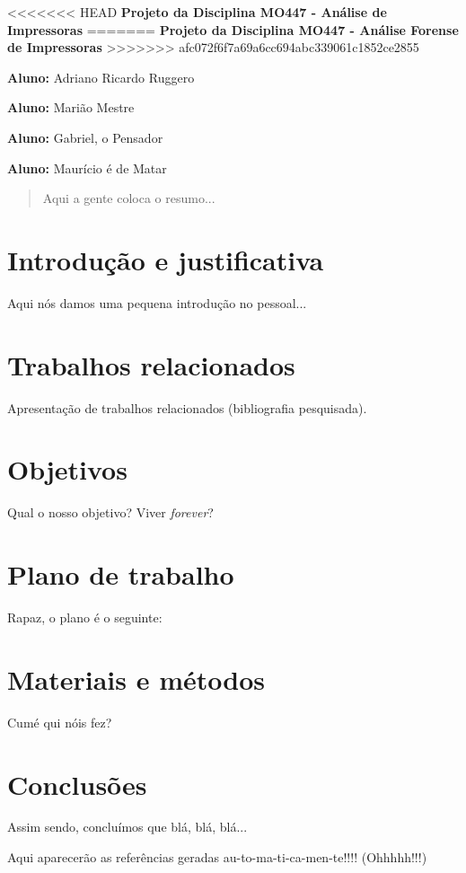\documentclass[12pt,twoside,a4paper]{article}
\begin{document}
\vskip 15mm

\begin{center} 
<<<<<<< HEAD
\textbf{Projeto da Disciplina MO447 - Análise de Impressoras}
=======
\textbf{Projeto da Disciplina MO447 - Análise Forense de Impressoras}
>>>>>>> afc072f6f7a69a6cc694abc339061c1852ce2855
\end{center}

\vskip 5mm

\textbf{Aluno:} Adriano Ricardo Ruggero

\textbf{Aluno:} Marião Mestre

\textbf{Aluno:} Gabriel, o Pensador

\textbf{Aluno:} Maurício é de Matar

\vskip 20mm

\begin{abstract}

Aqui a gente coloca o resumo...

\end{abstract}

\newpage
\pagestyle{plain}
\headheight 0.0cm
\headsep 0.0cm
\footskip 2.2cm

\section{Introdução e justificativa}
\label{sec:introduction}

Aqui nós damos uma pequena introdução no pessoal...

\section{Trabalhos relacionados}
\label{sec:related}

Apresentação de trabalhos relacionados (bibliografia pesquisada).	


\section{Objetivos}
\label{sec:objects}

Qual o nosso objetivo? Viver \textit{forever}?

\section{Plano de trabalho}
\label{sec:plan}

Rapaz, o plano é o seguinte:
 
\section{Materiais e métodos}
\label{sec:materials}

Cumé qui nóis fez?	

\section{Conclusões}
\label{sec:conclusions}

Assim sendo, concluímos que blá, blá, blá...

{}


Aqui aparecerão as referências geradas au-to-ma-ti-ca-men-te!!!! (Ohhhhh!!!)
\end{document}
